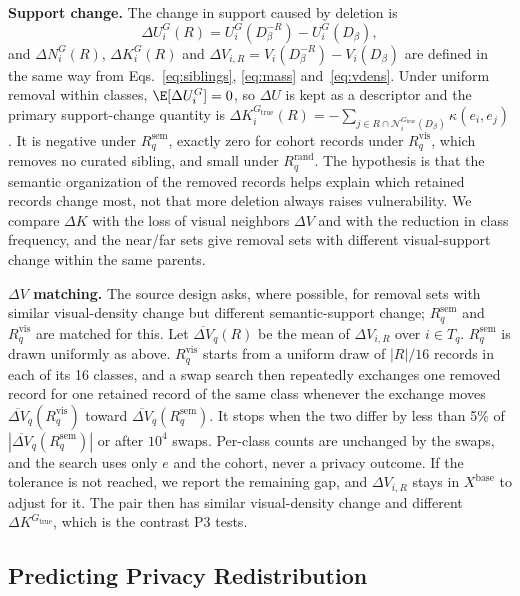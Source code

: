 \documentclass{article} %
\newcommand{\Gtrue}{G_{\mathrm{true}}}
\begin{document}
\textbf{Support change.} The change in support caused by deletion is
\begin{equation}
\Delta U_i^{G}(R)=U_i^{G}(D_\beta^{-R})-U_i^{G}(D_\beta),
\label{eq:dsupport}
\end{equation}
and $\Delta N_i^G(R)$, $\Delta K_i^G(R)$ and $\Delta V_{i,R}=V_i(D_\beta^{-R})-V_i(D_\beta)$ are defined in the same way from Eqs.~\ref{eq:siblings}, \ref{eq:mass} and~\ref{eq:vdens}. Under uniform removal within classes, $\E[\Delta U_i^G]=0$, so $\Delta U$ is kept as a descriptor and the primary support-change quantity is $\Delta K_i^{\Gtrue}(R)=-\sum_{j\in R\cap\mathcal{N}_i^{\Gtrue}(D_\beta)}\kappa(e_i,e_j)$. It is negative under $R^{\mathrm{sem}}_q$, exactly zero for cohort records under $R^{\mathrm{vis}}_q$, which removes no curated sibling, and small under $R^{\mathrm{rand}}_q$. The hypothesis is that the semantic organization of the removed records helps explain which retained records change most, not that more deletion always raises vulnerability. We compare $\Delta K$ with the loss of visual neighbors $\Delta V$ and with the reduction in class frequency, and the near/far sets give removal sets with different visual-support change within the same parents.

\textbf{$\Delta V$ matching.} The source design asks, where possible, for removal sets with similar visual-density change but different semantic-support change; $R^{\mathrm{sem}}_q$ and $R^{\mathrm{vis}}_q$ are matched for this. Let $\overline{\Delta V}_q(R)$ be the mean of $\Delta V_{i,R}$ over $i\in T_q$. $R^{\mathrm{sem}}_q$ is drawn uniformly as above. $R^{\mathrm{vis}}_q$ starts from a uniform draw of $|R|/16$ records in each of its 16 classes, and a swap search then repeatedly exchanges one removed record for one retained record of the same class whenever the exchange moves $\overline{\Delta V}_q(R^{\mathrm{vis}}_q)$ toward $\overline{\Delta V}_q(R^{\mathrm{sem}}_q)$. It stops when the two differ by less than 5\% of $|\overline{\Delta V}_q(R^{\mathrm{sem}}_q)|$ or after $10^4$ swaps. Per-class counts are unchanged by the swaps, and the search uses only $e$ and the cohort, never a privacy outcome. If the tolerance is not reached, we report the remaining gap, and $\Delta V_{i,R}$ stays in $X^{\mathrm{base}}$ to adjust for it. The pair then has similar visual-density change and different $\Delta K^{\Gtrue}$, which is the contrast P3 tests.

\subsection{Predicting Privacy Redistribution}
\label{sec:prediction}
\end{document}
